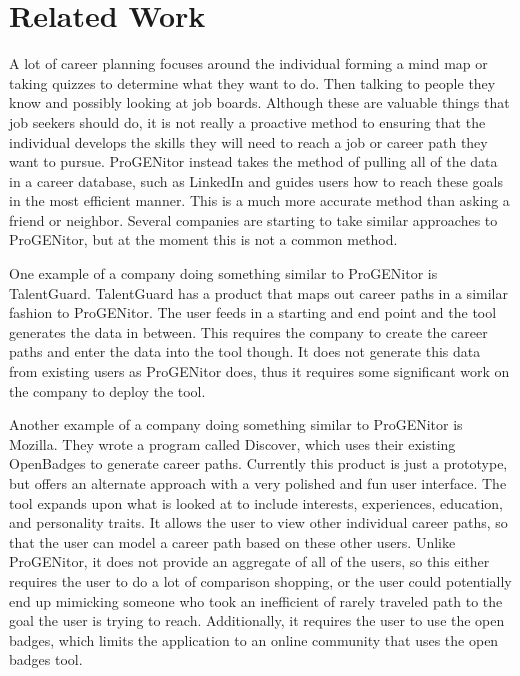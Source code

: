 \section{Related Work}
\label{sect:related-work}
A lot of career planning focuses around the individual forming a mind map or
taking quizzes to determine what they want to do.  Then talking to people they
know and possibly looking at job boards.  Although these are valuable things
that job seekers should do, it is not really a proactive method to ensuring that
the individual develops the skills they will need to reach a job or career path
they want to pursue.  ProGENitor instead takes the method of pulling all of the
data in a career database, such as LinkedIn and guides users how to reach these
goals in the most efficient manner.  This is a much more accurate method than
asking a friend or neighbor.  Several companies are starting to take similar
approaches to ProGENitor, but at the moment this is not a common method.

One example of a company doing something similar to ProGENitor is
TalentGuard\cite{talentguard}.  TalentGuard has a product that maps out career
paths in a similar fashion to ProGENitor.  The user feeds in a starting and end
point and the tool generates the data in between.  This requires the company to
create the career paths and enter the data into the tool though.  It does not
generate this data from existing users as ProGENitor does, thus it requires some
significant work on the company to deploy the tool.

Another example of a company doing something similar to ProGENitor is Mozilla. 
They wrote a program called Discover\cite{discover}, which uses their existing
OpenBadges\cite{openbadges} to generate career paths.  Currently this product is
just a prototype, but offers an alternate approach with a very polished and fun
user interface.  The tool expands upon what is looked at to include interests,
experiences, education, and personality traits.  It allows the user to view
other individual career paths, so that the user can model a career path based on
these other users.  Unlike ProGENitor, it does not provide an aggregate of all
of the users, so this either requires the user to do a lot of comparison shopping,
or the user could potentially end up mimicking someone who took an inefficient
of rarely traveled path to the goal the user is trying to reach.  Additionally,
it requires the user to use the open badges, which limits the application to an
online community that uses the open badges tool.

